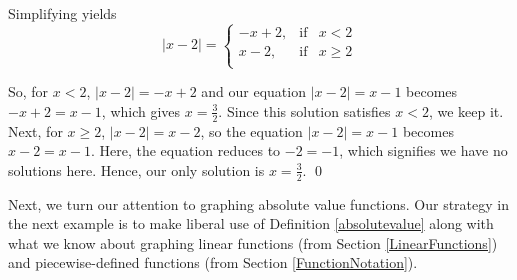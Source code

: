 \begin{ex}
\begin{enumerate}
Simplifying yields \[ |x-2| = \left\{ \begin{array}{rcl} -x+2, & \mbox{if} & x < 2 \\ x-2, & \mbox{if} & x \geq 2 \\ \end{array} \right.\]

So, for $x<2$, $|x-2| = -x+2$ and our equation  $|x-2| = x-1$ becomes $-x+2 = x-1$, which gives $x = \frac{3}{2}$.  Since this solution satisfies $x < 2$, we keep it.  Next, for $x \geq 2$, $|x-2| = x-2$, so the equation $|x-2| = x-1$ becomes $x-2 = x-1$.  Here, the equation reduces to $-2 = -1$, which signifies we have no solutions here.  Hence, our only solution is $x = \frac{3}{2}$.  \qed

\end{enumerate}

\end{ex}

Next, we turn our attention to graphing absolute value functions.  Our strategy in the next example is to make liberal use of Definition \ref{absolutevalue} along with what we know about graphing linear functions (from Section \ref{LinearFunctions}) and piecewise-defined functions (from Section \ref{FunctionNotation}).


